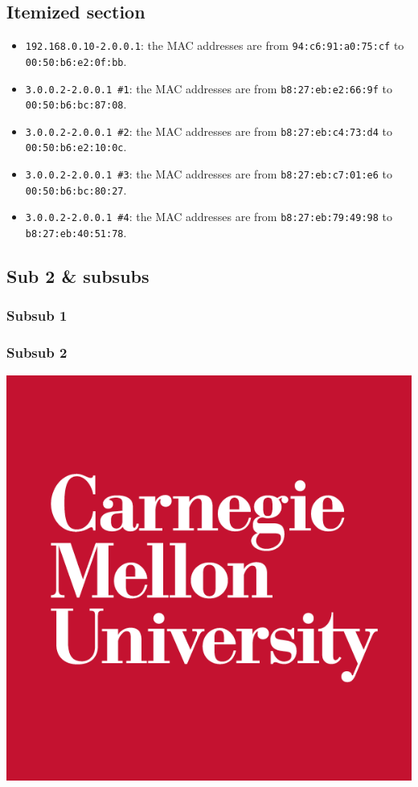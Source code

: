 \documentclass[10pt]{article}
\begin{document}
\subsection{Itemized section}

\begin{itemize}
  \item {
    \verb|192.168.0.10-2.0.0.1|: the MAC addresses are from
    \verb|94:c6:91:a0:75:cf| to \verb|00:50:b6:e2:0f:bb|.
  }
  \item {
    \verb|3.0.0.2-2.0.0.1 #1|: the MAC addresses are from
    \verb|b8:27:eb:e2:66:9f| to \verb|00:50:b6:bc:87:08|.
  }
  \item {
    \verb|3.0.0.2-2.0.0.1 #2|: the MAC addresses are from
    \verb|b8:27:eb:c4:73:d4| to \verb|00:50:b6:e2:10:0c|.
  }
  \item {
    \verb|3.0.0.2-2.0.0.1 #3|: the MAC addresses are from
    \verb|b8:27:eb:c7:01:e6| to \verb|00:50:b6:bc:80:27|.
  }
  \item {
    \verb|3.0.0.2-2.0.0.1 #4|: the MAC addresses are from
    \verb|b8:27:eb:79:49:98| to \verb|b8:27:eb:40:51:78|.
  }
\end{itemize}

\subsection{Sub 2 \& subsubs}

\subsubsection{Subsub 1}
\subsubsection{Subsub 2}
\begin{center}
  \includegraphics[scale=0.2]{cmu}
\end{center}
\end{document}
